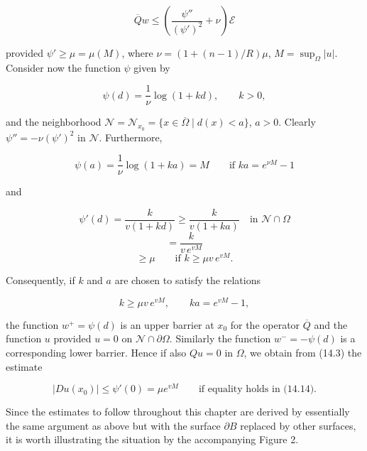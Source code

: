 \begin{equation}\tag{14.10}
\overline{Q}w \leq \left(\frac{\psi''}{(\psi')^2}+\nu\right)\mathcal{E}
\end{equation}

provided $\psi' \geq \mu=\mu(M)$, where $\nu=(1+(n-1)/R)\mu$, $M=\sup_\Omega |u|$.
Consider now the function $\psi$ given by

\begin{equation}\tag{14.11}
\psi(d)=\frac{1}{\nu}\log(1+kd), \qquad k>0,
\end{equation}

and the neighborhood $\mathcal{N}=\mathcal{N}_{x_0}=\{x\in\overline{\Omega}\mid
d(x)<a\}$, $a>0$. Clearly $\psi''=-\nu(\psi')^2$ in $\mathcal{N}$. Furthermore,

\begin{equation}\tag{14.12}
\psi(a)=\frac{1}{\nu}\log(1+ka)=M \qquad \text{if } ka=e^{\nu M}-1
\end{equation}



and

\begin{equation}
\psi'(d)=\frac{k}{v(1+kd)}\geq \frac{k}{v(1+ka)} \quad \text{in } \mathcal{N}\cap \Omega
\tag{14.13}
\end{equation}
\[
=\frac{k}{v\,e^{vM}}
\]
\[
\geq \mu \qquad \text{if } k\geq \mu v\, e^{vM}.
\]

Consequently, if $k$ and $a$ are chosen to satisfy the relations

\begin{equation}
k\geq \mu v\, e^{vM}, \qquad ka=e^{vM}-1,
\tag{14.14}
\end{equation}

the function $w^+=\psi(d)$ is an upper barrier at $x_0$ for the operator $\overline{Q}$ and the function
$u$ provided $u=0$ on $\mathcal{N}\cap \partial\Omega$. Similarly the function $w^-=-\psi(d)$ is a corresponding
lower barrier. Hence if also $Qu=0$ in $\Omega$, we obtain from (14.3) the estimate

\begin{equation}
|Du(x_0)|\leq \psi'(0)=\mu e^{vM} \qquad \text{if equality holds in (14.14).}
\tag{14.15}
\end{equation}

    Since the estimates to follow throughout this chapter are derived by essentially
the same argument as above but with the surface $\partial B$ replaced by other surfaces, it
is worth illustrating the situation by the accompanying Figure 2.

